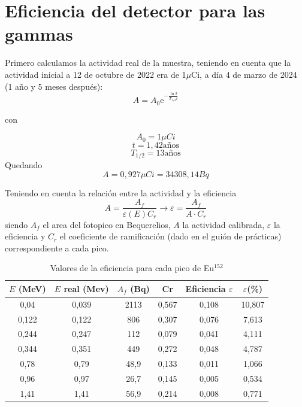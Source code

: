 \documentclass[a4paper,12pt,spanish]{article}
\begin{document}
	
	
	\section{Eficiencia del detector para las gammas}
	
	Primero calculamos la actividad real de la muestra, teniendo en cuenta que la actividad inicial a 12 de octubre de 2022 era de 1$\mu$Ci, a día 4 de marzo de 2024 (1 año y 5
	meses después):
	\[ A = A_0 \text{e}^{-\frac{\ln2}{T_{1/2}t}}\]
		
	con 
	
	\[A_0 = 1\si{\mu Ci}\]
	\[t = 1,42 \text{años}\]
	\[ T_{1/2} = 13 \text{años}
	\]
	Quedando
	\[ A = 0,927\si{\mu Ci} = 34308,14 \si{Bq}
	\]
	
	Teniendo en cuenta la relación entre la actividad y la eficiencia
	\[ A = \frac{A_f}{\varepsilon(E) C_r} \longrightarrow \varepsilon = \frac{A_f}{A·C_r}
	\]
	siendo $A_f$ el area del fotopico en Bequerelios, $A$ la actividad calibrada, $\varepsilon$ la eficiencia y $C_r$ el coeficiente de ramificación (dado en el guión de prácticas) correspondiente a cada pico.
	
	\begin{table}[H]
		\centering
		\begin{tabular}{|c|c|c|c|c|c|}
			\hline
			$E$ (MeV) & $E$ real (Mev) & $A_f$ (Bq) & Cr    & Eficiencia $\varepsilon$ & $\varepsilon$(\%) \\ \hline\hline
			0,04      & 0,039          & 2113       & 0,567 & 0,108      & 10,807          \\ \hline
			0,122     & 0,122          & 806        & 0,307 & 0,076      & 7,613           \\ \hline
			0,244     & 0,247          & 112        & 0,079 & 0,041      & 4,111           \\ \hline
			0,344     & 0,351          & 449        & 0,272 & 0,048      & 4,787           \\ \hline
			0,78      & 0,79           & 48,9       & 0,133 & 0,011      & 1,066           \\ \hline
			0,96      & 0,97           & 26,7       & 0,145 & 0,005      & 0,534           \\ \hline
			1,41      & 1,41           & 56,9       & 0,214 & 0,008      & 0,771           \\ \hline
		\end{tabular}
	\caption{Valores de la eficiencia para cada pico de Eu$^{152}$}
	\end{table}
	
\end{document}
